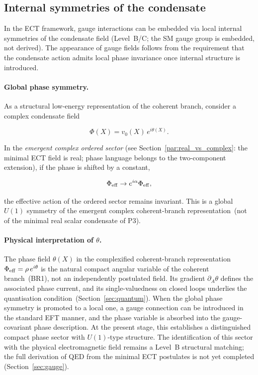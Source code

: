 \documentclass[11pt,a4paper]{article}
\numberwithin{equation}{section}
\begin{document}
\subsection{Internal symmetries of the condensate}

In the ECT framework, gauge interactions can be embedded via local
internal symmetries of the condensate field (Level~B/C; the SM gauge
group is embedded, not derived).  The appearance of gauge fields
follows from the requirement that the condensate action admits
local phase invariance once internal structure is introduced.

\paragraph{Global phase symmetry.}

As a structural low-energy representation of the coherent branch,
consider a complex condensate field

\begin{equation}
\Phi(X) = v_0(X)\,e^{i\theta(X)} .
\end{equation}

In the \emph{emergent complex ordered sector} (see
Section~\ref{par:real_vs_complex}: the minimal ECT field is real;
phase language belongs to the two-component extension), if the phase
is shifted by a constant,

\begin{equation}
\Phi_{\rm eff} \rightarrow e^{i\alpha}\Phi_{\rm eff} ,
\end{equation}

the effective action of the ordered sector remains invariant.
This is a global $U(1)$ symmetry of the emergent complex coherent-branch
representation~(not of the minimal real scalar condensate of P3).

\paragraph{Physical interpretation of $\theta$.}
The phase field $\theta(X)$ in the complexified coherent-branch
representation $\Phi_{\rm eff} = \rho\,e^{i\theta}$ is the natural
compact angular variable of the coherent branch~(BR1), not an
independently postulated field.
Its gradient $\partial_A\theta$ defines the associated phase current,
and its single-valuedness on closed loops underlies the quantisation
condition~(Section~\ref{sec:quantum}).
When the global phase symmetry is promoted to a local one, a
gauge connection can be introduced in the standard EFT manner,
and the phase variable is absorbed into the gauge-covariant
phase description.
At the present stage, this establishes a distinguished compact
phase sector with $U(1)$-type structure.
The identification of this sector with the physical electromagnetic
field remains a Level~B structural matching; the full derivation
of QED from the minimal ECT postulates is not yet completed
(Section~\ref{sec:gauge}).
\end{document}
